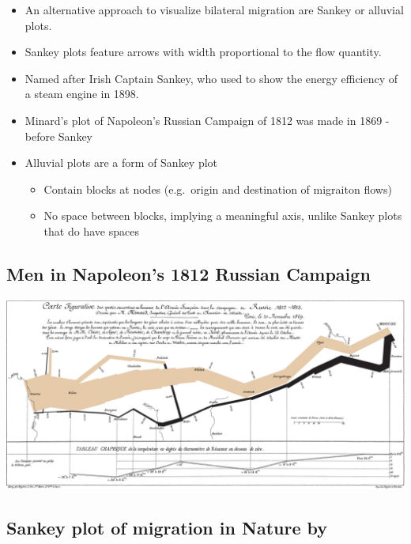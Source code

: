 \documentclass[
]{book}
\providecommand{\tightlist}{%
  \setlength{\itemsep}{0pt}\setlength{\parskip}{0pt}}
\begin{document}
\begin{itemize}
\tightlist
\item
  An alternative approach to visualize bilateral migration are Sankey or alluvial plots.
\item
  Sankey plots feature arrows with width proportional to the flow quantity.
\item
  Named after Irish Captain Sankey, who used to show the energy efficiency of a steam engine in 1898.
\item
  Minard's plot of Napoleon's Russian Campaign of 1812 was made in 1869 - before Sankey
\item
  Alluvial plots are a form of Sankey plot

  \begin{itemize}
  \tightlist
  \item
    Contain blocks at nodes (e.g.~origin and destination of migraiton flows)
  \item
    No space between blocks, implying a meaningful axis, unlike Sankey plots that do have spaces
  \end{itemize}
\end{itemize}

\hypertarget{men-in-napoleons-1812-russian-campaign}{%
\subsection{Men in Napoleon's 1812 Russian Campaign}\label{men-in-napoleons-1812-russian-campaign}}

\includegraphics[width=27.82in]{img/Minard-napolean}

\hypertarget{sankey-plot-of-migration-in-nature-by-butler2017}{%
\subsection{\texorpdfstring{Sankey plot of migration in Nature by \citet{Butler2017}}{Sankey plot of migration in Nature by @Butler2017}}\label{sankey-plot-of-migration-in-nature-by-butler2017}}
\end{document}

